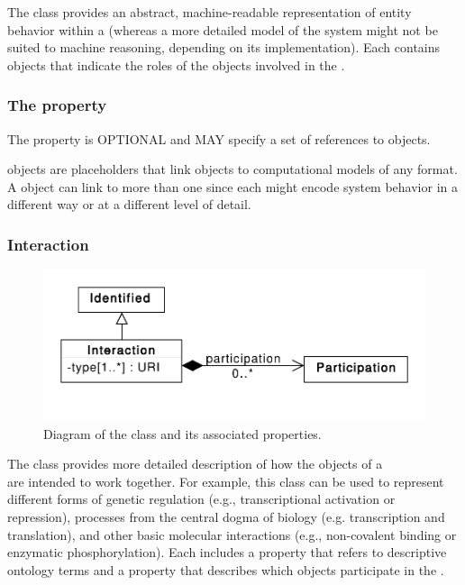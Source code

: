 The  class provides an abstract, machine-readable representation of entity behavior within a  (whereas a more detailed model of the system might not be suited to machine reasoning, depending on its implementation).
Each  contains  objects that indicate the roles of the  objects involved in the .

\subsubsection*{The  property}\label{sec:models}
The  property is OPTIONAL and MAY specify a set of  references to  objects.

 objects are placeholders that link  objects to computational models of any format.
A  object can link to more than one  since each might encode system behavior in a different way or at a different level of detail.

\subsubsection{Interaction}
\label{sec:Interaction}

\begin{figure}[ht]
\begin{center}
\includegraphics[scale=0.6]{uml/interaction}
\caption[]{Diagram of the  class and its associated properties.}
\label{uml:interaction}
\end{center}
\end{figure}

The  class provides more detailed description of how the  objects of a\\  are intended to work together.
For example, this class can be used to represent different forms of genetic regulation (e.g., transcriptional activation or repression), processes from the central dogma of biology (e.g. transcription and translation), and other basic molecular interactions (e.g., non-covalent binding or enzymatic phosphorylation).
Each  includes a  property that refers to descriptive ontology terms and a  property that describes which  objects participate in the .

